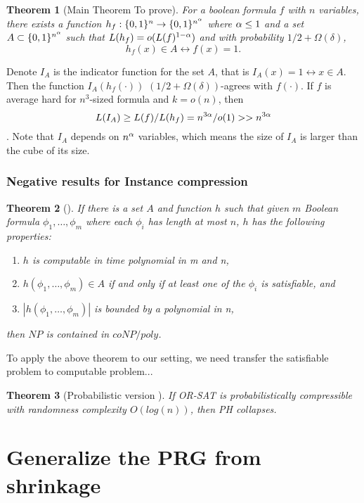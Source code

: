\documentclass[12pt]{article}
\newtheorem{theorem}{Theorem}[section]
\renewcommand{\.}{,\ldots,}
\begin{document}
\begin{theorem}[Main Theorem To prove]
For a boolean formula $f$ with $n$ variables, there exists a function $h_f:\{0,1\}^n\rightarrow \{0,1\}^{n^\alpha}$ where $\alpha \leq 1$  and a set $A\subset \{0,1\}^{n^\alpha}$ such that $L(h_f)=o(L(f)^{1-\alpha})$ and with probability $1/2+\Omega(\delta)$, $$h_f(x)\in A \leftrightarrow f(x)=1.$$
\end{theorem}
Denote $I_A$ is the indicator function for the set $A$, that is $I_A(x)=1\leftrightarrow x\in A$. Then the function $I_A(h_f(\cdot))$ $(1/2+\Omega(\delta))$-agrees with $f(\cdot)$. If $f$ is average hard for $n^3$-sized formula and $k=o(n)$, then $$L(I_A)\geq L(f)/L(h_f)=n^{3\alpha}/o(1)>>n^{3\alpha}$$. Note that $I_A$ depends on $n^{\alpha}$ variables, which means the size of $I_A$ is larger than the cube of its size. 


\subsubsection{Negative results for Instance compression}
\begin{theorem}[\cite{fortnow2008infeasibility}]
If there is a set $A$ and function $h$ such
that given $m$ Boolean formula $\phi_1, \ldots, \phi_m$ where each $\phi_i$ has length at most $n$, $h$ has the following
properties:
\begin{enumerate}
\item  $h$ is computable in time polynomial in m and n,
\item  $h(\phi_1, \ldots, \phi_m) \in A$ if and only if at least one of the $\phi_i$ is satisfiable, and
\item  $|h(\phi_1, \ldots, \phi_m)|$ is bounded by a polynomial in n,
\end{enumerate}
then  $NP$ is contained in $coNP/poly$.
\end{theorem}

To apply the above theorem to our setting, we need transfer the satisfiable problem to computable problem... 

\begin{theorem}[Probabilistic version \cite{fortnow2008infeasibility}]
If OR-SAT is probabilistically compressible with randomness complexity $O(log(n))$,
then PH collapses.
\end{theorem}

\section{Generalize the PRG from shrinkage}	
\end{document}
